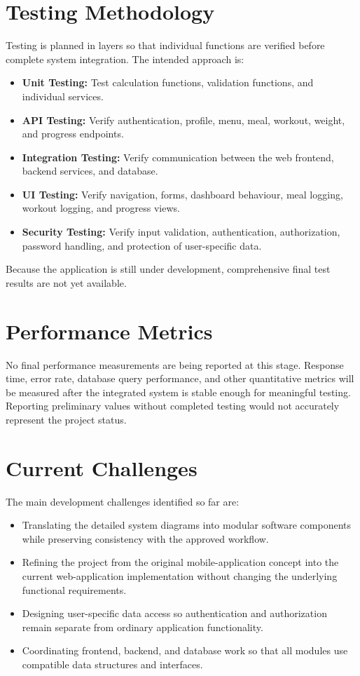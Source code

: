 \documentclass[11pt,a4paper]{article}
\begin{document}
\section{Testing Methodology}
Testing is planned in layers so that individual functions are verified before complete system integration. The intended approach is:
\begin{itemize}
    \item \textbf{Unit Testing:} Test calculation functions, validation functions, and individual services.
    \item \textbf{API Testing:} Verify authentication, profile, menu, meal, workout, weight, and progress endpoints.
    \item \textbf{Integration Testing:} Verify communication between the web frontend, backend services, and database.
    \item \textbf{UI Testing:} Verify navigation, forms, dashboard behaviour, meal logging, workout logging, and progress views.
    \item \textbf{Security Testing:} Verify input validation, authentication, authorization, password handling, and protection of user-specific data.
\end{itemize}

Because the application is still under development, comprehensive final test results are not yet available.

\section{Performance Metrics}
No final performance measurements are being reported at this stage. Response time, error rate, database query performance, and other quantitative metrics will be measured after the integrated system is stable enough for meaningful testing. Reporting preliminary values without completed testing would not accurately represent the project status.

\section{Current Challenges}
The main development challenges identified so far are:
\begin{itemize}
    \item Translating the detailed system diagrams into modular software components while preserving consistency with the approved workflow.
    \item Refining the project from the original mobile-application concept into the current web-application implementation without changing the underlying functional requirements.
    \item Designing user-specific data access so authentication and authorization remain separate from ordinary application functionality.
    \item Coordinating frontend, backend, and database work so that all modules use compatible data structures and interfaces.
\end{itemize}
\end{document}
